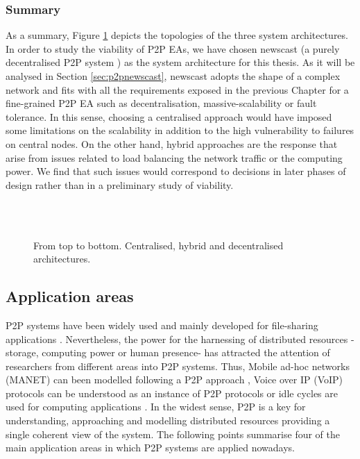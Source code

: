 \subsubsection{Summary}

As a summary, Figure \ref{fig:p2parchitectures} depicts the topologies of the three system architectures. In order to study the viability of P2P EAs, we have chosen newscast (a purely decentralised P2P system \cite{jelasity:newscast}) as the system architecture for this thesis. As it will be analysed in Section \ref{sec:p2pnewscast}, newscast adopts the shape of a complex network and fits with all the requirements exposed in the previous Chapter for a fine-grained P2P EA such as decentralisation, massive-scalability or fault tolerance. In this sense, choosing a centralised approach would have imposed some limitations on the scalability in addition to the high vulnerability to failures on central nodes. On the other hand, hybrid approaches are the response that arise from issues related to load balancing the network traffic or the computing power. We find that such issues would correspond to decisions in later phases of design rather than in a preliminary study of viability.


\begin{figure}[htbp]
\centering
{}\\
\\
\caption{From top to bottom. Centralised, hybrid and decentralised architectures.}
\label{fig:p2parchitectures}
\end{figure}



\clearpage
\subsection{Application areas}
\label{sec:p2papplication}


P2P systems have been widely used and mainly developed for file-sharing applications \cite{napstervsgnutella}. Nevertheless, the power for the harnessing of distributed resources -storage, computing power or human presence-  has attracted the attention of researchers from different areas into P2P systems. Thus, Mobile ad-hoc networks (MANET) can been modelled following a P2P approach \cite{manetp2p}, Voice over IP (VoIP) protocols can be understood as an instance of P2P protocols \cite{voipp2p} or idle cycles are used for computing applications \cite{deathtaxes}. In the widest sense, P2P is a key for understanding, approaching and modelling distributed resources providing a single coherent view of the system. The following points summarise four of the main application areas in which P2P systems are applied nowadays. 

